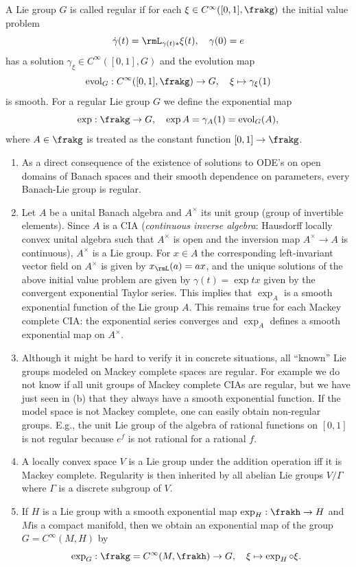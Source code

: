 \begin{defn}
    A Lie group $G$ is called regular if for each $\xi\in C^\infty([0,1],\frakg)$ the initial value problem
    \[\dot\gamma(t)=\rmL_{\gamma(t)\ast}\xi(t),\quad \gamma(0)=e\]
    has a solution $\gamma_\xi\in C^\infty([0,1],G)$ and the evolution map 
    \[\mathrm{evol}_G:C^\infty([0,1],\frakg)\to G,\quad \xi\mapsto \gamma_\xi(1)\]
    is smooth. For a regular Lie group $G$ we define the exponential map
    \[\exp:\frakg\to G,\quad \exp A=\gamma_A(1)=\mathrm{evol}_G(A),\]
    where $A\in\frakg$ is treated as the constant function $[0,1]\to \frakg$.
\end{defn}
\begin{rem}
    \begin{enumerate}[label=(\alph*)]
        \item As a direct consequence of the existence of solutions to ODE's on open domains of Banach spaces and their smooth dependence on parameters, every Banach-Lie group is regular.
        \item Let $A$ be a unital Banach algebra and $A^\times$ its unit group (group of invertible elements). Since $A$ is a CIA (\emph{continuous inverse algebra}: Hausdorff locally convex unital algebra such that $A^\times$ is open and the inversion map $A^\times\to A$ is continuous), $A^\times$ is a Lie group. For $x\in A$ the corresponding left-invariant vector field on $A^\times$ is given by $x_\rmL(a)=ax$, and the unique solutions of the above initial value problem are given by $\gamma(t)=\exp tx$ given by the convergent exponential Taylor series. This implies that $\exp_A$ is a smooth exponential function of the Lie group $A$. This remains true for each Mackey complete CIA: the exponential series converges and $\exp_A$ defines a smooth exponential map on $A^\times$.
        \item Although it might be hard to verify it in concrete situations, all ``known'' Lie groups modeled on Mackey complete spaces are regular. For example we do not know if all unit groups of Mackey complete CIAs are regular, but we have just seen in (b) that they always have a smooth exponential function. If the model space is not Mackey complete, one can easily obtain non-regular groups. E.g., the unit Lie group of the algebra of rational functions on $[0,1]$ is not regular because $e^f$ is not rational for a rational $f$.
        \item A locally convex space $V$ is a Lie group under the addition operation iff it is Mackey complete. Regularity is then inherited by all abelian Lie groups $V\slash \varGamma$ where $\varGamma$ is a discrete subgroup of $V$.
        \item If $H$ is a Lie group with a smooth exponential map $\exp_H:\frakh\to H$ and $M$is a compact manifold, then we obtain an exponential map of the group $G=C^\infty(M,H)$ by
        \[\exp_G:\frakg=C^\infty(M,\frakh)\to G,\quad \xi\mapsto \exp_H\circ \xi.\]
    \end{enumerate}
\end{rem}

